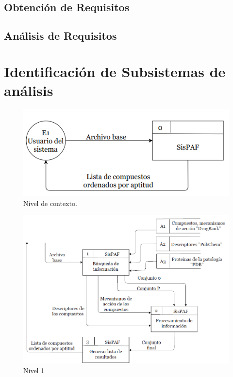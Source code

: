 \subsection{Obtención de Requisitos}

\newpage

\newpage
\subsection{Análisis de Requisitos}

\section{Identificación de Subsistemas de análisis}
\begin{figure}[H]
    \centering
    \includegraphics[scale=0.7]{Capitulo2/images/DFDContext.png}
    \caption{Nivel de contexto.}
    \label{nivel contexto}
\end{figure}
\begin{figure}[H]
    \centering
    \includegraphics[scale=0.65]{Capitulo2/images/DFDN-1.png}
    \caption{Nivel 1}
    \label{nivel_1}
\end{figure}
